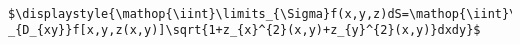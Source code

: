 ~\\

\begin{lstlisting}
$\displaystyle{\mathop{\iint}\limits_{\Sigma}f(x,y,z)dS=\mathop{\iint}\limits
_{D_{xy}}f[x,y,z(x,y)]\sqrt{1+z_{x}^{2}(x,y)+z_{y}^{2}(x,y)}dxdy}$
\end{lstlisting}
	
	
	

